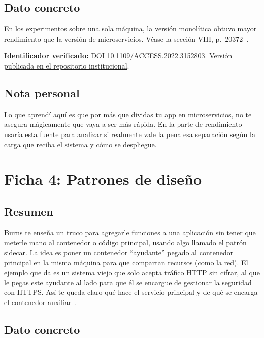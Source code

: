 \documentclass[12pt,a4paper]{article}
\begin{document}
\subsection*{Dato concreto}

En los experimentos sobre una sola máquina, la versión monolítica obtuvo mayor rendimiento que la versión de microservicios. Véase la sección VIII, p.~20372~\cite{blinowski2022}.

\textbf{Identificador verificado:} DOI \href{https://doi.org/10.1109/ACCESS.2022.3152803}{10.1109/ACCESS.2022.3152803}. \href{https://mostwiedzy.pl/pl/publication/download/1/monolithic-vs-microservice-architecture-a-performance-and-scalability-evaluation_70008.pdf}{Versión publicada en el repositorio institucional}.

\subsection*{Nota personal}

Lo que aprendí aquí es que por más que dividas tu app en microservicios, no te asegura mágicamente que vaya a ser más rápida. En la parte de rendimiento usaría esta fuente para analizar si realmente vale la pena esa separación según la carga que reciba el sistema y cómo se despliegue.

\section*{Ficha 4: Patrones de diseño}

\subsection*{Resumen}

Burns te enseña un truco para agregarle funciones a una aplicación sin tener que meterle mano al contenedor o código principal, usando algo llamado el patrón sidecar. La idea es poner un contenedor ``ayudante'' pegado al contenedor principal en la misma máquina para que compartan recursos (como la red). El ejemplo que da es un sistema viejo que solo acepta tráfico HTTP sin cifrar, al que le pegas este ayudante al lado para que él se encargue de gestionar la seguridad con HTTPS. Así te queda claro qué hace el servicio principal y de qué se encarga el contenedor auxiliar~\cite{burns2024}.

\subsection*{Dato concreto}
\end{document}

